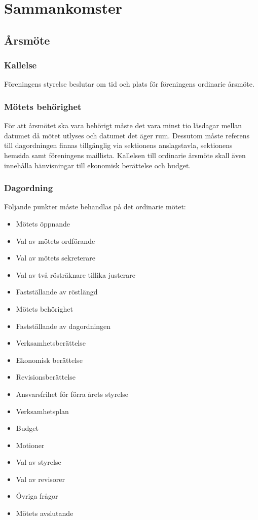 \section{Sammankomster}

\subsection{Årsmöte}

\subsubsection{Kallelse}
Föreningens styrelse beslutar om tid och plats för föreningens ordinarie årsmöte.

\subsubsection{Mötets behörighet} \label{sec:mötets-behörighet}
För att årsmötet ska vara behörigt måste det vara minst tio läsdagar mellan datumet då mötet utlyses och datumet det äger rum. Dessutom måste referens till dagordningen finnas tillgänglig via sektionens anslagstavla, sektionens hemsida samt föreningens maillista. Kallelsen till ordinarie årsmöte skall även innehålla hänvisningar till ekonomisk berättelse och budget.

\subsubsection{Dagordning}
Följande punkter måste behandlas på det ordinarie mötet:
\begin{itemize}
    \item Mötets öppnande
    \item Val av mötets ordförande
    \item Val av mötets sekreterare
    \item Val av två rösträknare tillika justerare
    \item Fastställande av röstlängd
    \item Mötets behörighet
    \item Fastställande av dagordningen
    \item Verksamhetsberättelse
    \item Ekonomisk berättelse
    \item Revisionsberättelse
    \item Ansvarsfrihet för förra årets styrelse
    \item Verksamhetsplan
    \item Budget
    \item Motioner
    \item Val av styrelse
    \item Val av revisorer
    \item Övriga frågor
    \item Mötets avslutande
\end{itemize}

